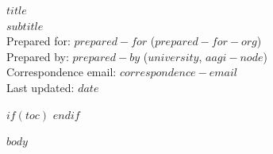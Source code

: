 \documentclass[12pt]{article}
\begin{document}
\thispagestyle{firstpage}
\afterpage{\aftergroup\restoregeometry}

\vspace*{0.6cm}

{\Large\sffamily\bfseries $title$}\\[2pt]
{\large\sffamily $subtitle$}\\[6pt]

Prepared for: $prepared-for$ ($prepared-for-org$)\\
Prepared by: $prepared-by$ ($university$, $aagi-node$)\\
Correspondence email: \href{mailto:$correspondence-email$}{$correspondence-email$}\\[2pt]
Last updated: $date$

$if(toc)$
\setcounter{page}{1}
\tableofcontents
$endif$

\par

$body$
\end{document}
